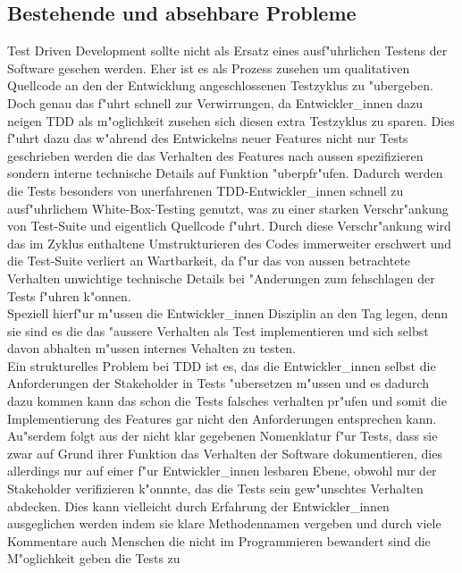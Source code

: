   \subsection{Bestehende und absehbare Probleme}
    Test Driven Development sollte nicht als Ersatz eines ausf"uhrlichen Testens
    der Software gesehen werden. Eher ist es als Prozess zusehen um qualitativen
    Quellcode an den der Entwicklung angeschlossenen Testzyklus zu "ubergeben.\\
    Doch genau das f"uhrt schnell zur Verwirrungen, da Entwickler\_innen dazu
    neigen TDD als m"oglichkeit zusehen sich diesen extra Testzyklus zu sparen.
    Dies f"uhrt dazu das w"ahrend des Entwickelns neuer Features nicht nur 
    Tests geschrieben werden die das Verhalten des Features nach aussen spezifizieren
    sondern interne technische Details auf Funktion "uberpfr"ufen. Dadurch werden
    die Tests besonders von unerfahrenen TDD-Entwickler\_innen schnell zu 
    ausf"uhrlichem White-Box-Testing genutzt, was zu einer starken Verschr"ankung
    von Test-Suite und eigentlich Quellcode f"uhrt. Durch diese Verschr"ankung
    wird das im Zyklus enthaltene Umstrukturieren des Codes immerweiter 
    erschwert und die Test-Suite verliert an Wartbarkeit, da f"ur das von aussen
    betrachtete Verhalten unwichtige technische Details bei "Anderungen zum 
    fehschlagen der Tests f"uhren k"onnen.\\
    Speziell hierf"ur m"ussen die Entwickler\_innen Disziplin an den Tag legen,
    denn sie sind es die das "aussere Verhalten als Test implementieren und sich
    selbst davon abhalten m"ussen internes Vehalten zu testen.\\
    Ein strukturelles Problem bei TDD ist es, das die Entwickler\_innen selbst
    die Anforderungen der Stakeholder in Tests "ubersetzen m"ussen und es 
    dadurch dazu kommen kann das schon die Tests falsches verhalten pr"ufen
    und somit die Implementierung des Features gar nicht den Anforderungen 
    entsprechen kann. Au"serdem folgt aus der nicht klar gegebenen Nomenklatur
    f"ur Tests, dass sie zwar auf Grund ihrer Funktion das Verhalten der 
    Software dokumentieren, dies allerdings nur auf einer f"ur Entwickler\_innen
    lesbaren Ebene, obwohl nur der Stakeholder verifizieren k"onnnte, das die 
    Tests sein gew"unschtes Verhalten abdecken. Dies kann vielleicht durch 
    Erfahrung der Entwickler\_innen ausgeglichen werden indem sie klare 
    Methodennamen vergeben und durch viele Kommentare auch Menschen die nicht 
    im Programmieren bewandert sind die M"oglichkeit geben die Tests zu 
